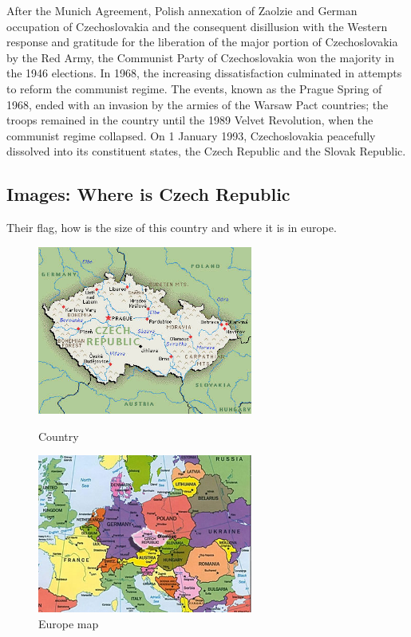 \documentclass[a4paper, 12pt]{report}
\begin{document}
	After the Munich Agreement, Polish annexation of Zaolzie and German occupation of Czechoslovakia and the consequent disillusion with the Western response and gratitude for the liberation of the major portion of Czechoslovakia by the Red Army, the Communist Party of Czechoslovakia won the majority in the 1946 elections. 
	In 1968, the increasing dissatisfaction culminated in attempts to reform the communist regime. The events, known as the Prague Spring of 1968, ended with an invasion by the armies of the Warsaw Pact countries; the troops remained in the country until the 1989 Velvet Revolution, when the communist regime collapsed. On 1 January 1993, Czechoslovakia peacefully dissolved into its constituent states, the Czech Republic and the Slovak Republic.

\newpage
\subsection{Images: Where is Czech Republic}
Their flag, how is the size of this country and where it is in europe.
	\begin{figure}[h] %
		\begin{center}
		\includegraphics[width=200pt]{czech-republic.jpg}
		\caption{Country}
		\includegraphics[width=200pt]{Europe_map.jpg}
		\caption{Europe map}
		\end{center}
	\end{figure}
\end{document}

